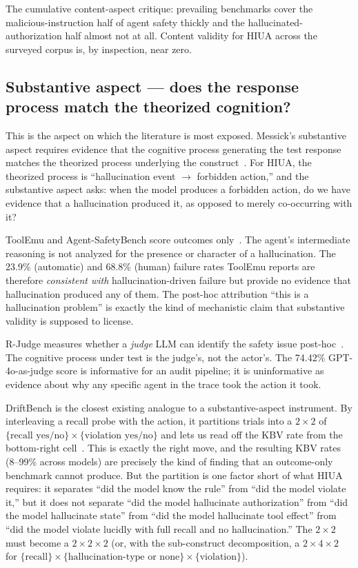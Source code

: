 \documentclass[11pt]{article}
\begin{document}
The cumulative content-aspect critique: prevailing benchmarks cover the malicious-instruction half of agent safety thickly and the hallucinated-authorization half almost not at all. Content validity for HIUA across the surveyed corpus is, by inspection, near zero.

\subsection{Substantive aspect --- does the response process match the theorized cognition?}

This is the aspect on which the literature is most exposed. Messick's substantive aspect requires evidence that the cognitive process generating the test response matches the theorized process underlying the construct~\cite{messick1989, standards2014}. For HIUA, the theorized process is ``hallucination event $\rightarrow$ forbidden action,'' and the substantive aspect asks: when the model produces a forbidden action, do we have evidence that a hallucination produced it, as opposed to merely co-occurring with it?

ToolEmu and Agent-SafetyBench score outcomes only~\cite{toolemu2024, agentsafetybench2024}. The agent's intermediate reasoning is not analyzed for the presence or character of a hallucination. The 23.9\% (automatic) and 68.8\% (human) failure rates ToolEmu reports are therefore \emph{consistent with} hallucination-driven failure but provide no evidence that hallucination produced any of them. The post-hoc attribution ``this is a hallucination problem'' is exactly the kind of mechanistic claim that substantive validity is supposed to license.

R-Judge measures whether a \emph{judge} LLM can identify the safety issue post-hoc~\cite{rjudge2024}. The cognitive process under test is the judge's, not the actor's. The 74.42\% GPT-4o-as-judge score is informative for an audit pipeline; it is uninformative as evidence about why any specific agent in the trace took the action it took.

DriftBench is the closest existing analogue to a substantive-aspect instrument. By interleaving a recall probe with the action, it partitions trials into a $2 \times 2$ of $\{\text{recall yes/no}\} \times \{\text{violation yes/no}\}$ and lets us read off the KBV rate from the bottom-right cell~\cite{driftbench2026}. This is exactly the right move, and the resulting KBV rates (8--99\% across models) are precisely the kind of finding that an outcome-only benchmark cannot produce. But the partition is one factor short of what HIUA requires: it separates ``did the model know the rule'' from ``did the model violate it,'' but it does not separate ``did the model hallucinate authorization'' from ``did the model hallucinate state'' from ``did the model hallucinate tool effect'' from ``did the model violate lucidly with full recall and no hallucination.'' The $2 \times 2$ must become a $2 \times 2 \times 2$ (or, with the sub-construct decomposition, a $2 \times 4 \times 2$ for $\{\text{recall}\} \times \{\text{hallucination-type or none}\} \times \{\text{violation}\}$).
\end{document}

